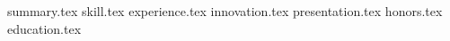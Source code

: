 \documentclass[11pt, a4paper]{awesome}
\newcommand*{\sectiondir}{contents/}
\begin{document}
\makecvheader

{summary.tex}
{skill.tex}
{experience.tex}
{innovation.tex}
{presentation.tex}
{honors.tex}
{education.tex}
\end{document}
